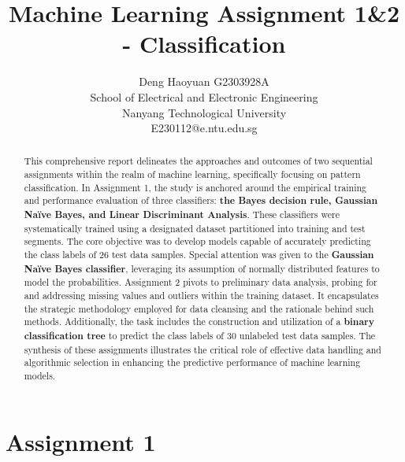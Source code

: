 \documentclass[12pt, onecolumn]{article}
\title{\vspace{-2em}Machine Learning Assignment 1\&2 - Classification}
\author{\small Deng Haoyuan G2303928A \\
\small School of Electrical and Electronic Engineering \\
\small Nanyang Technological University \\
\small E230112@e.ntu.edu.sg}
\date{\vspace{-2em}} %
\begin{document}
\maketitle
\thispagestyle{fancy} %
\begin{singlespace}
\begin{abstract}
This comprehensive report delineates the approaches and outcomes of two sequential assignments within the realm of machine learning, specifically focusing on pattern classification. In Assignment 1, the study is anchored around the empirical training and performance evaluation of three classifiers: \textbf{the Bayes decision rule, Gaussian Naïve Bayes, and Linear Discriminant Analysis}. These classifiers were systematically trained using a designated dataset partitioned into training and test segments. The core objective was to develop models capable of accurately predicting the class labels of 26 test data samples. Special attention was given to the \textbf{Gaussian Naïve Bayes classifier}, leveraging its assumption of normally distributed features to model the probabilities. Assignment 2 pivots to preliminary data analysis, probing for and addressing missing values and outliers within the training dataset. It encapsulates the strategic methodology employed for data cleansing and the rationale behind such methods. Additionally, the task includes the construction and utilization of a \textbf{binary classification tree} to predict the class labels of 30 unlabeled test data samples. The synthesis of these assignments illustrates the critical role of effective data handling and algorithmic selection in enhancing the predictive performance of machine learning models.
\end{abstract}
\end{singlespace}

\section{Assignment 1}
\end{document}
